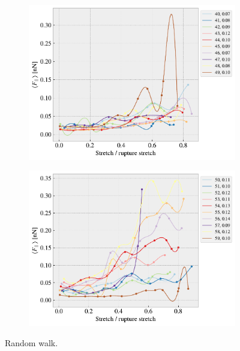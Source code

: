 \begin{figure}[H]
\begin{subfigure}[b]{0.49\textwidth}
        \includegraphics[width=\textwidth]{figures/stretch_profiles/RW/SP_4_RW.pdf}
        \caption{}
        \label{fig:}
    \end{subfigure}
    \hfill
    \begin{subfigure}[b]{0.49\textwidth}
        \centering
        \includegraphics[width=\textwidth]{figures/stretch_profiles/RW/SP_5_RW.pdf}
        \caption{}
        \label{fig:}
    \end{subfigure}
    \hfill
    \caption{Random walk.}
    \label{fig:}
\end{figure}


